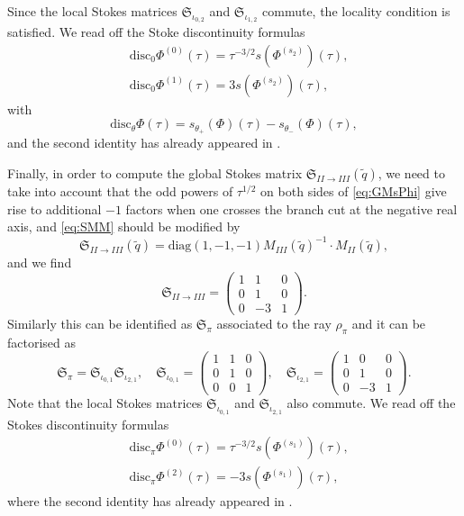 \documentclass[12pt,reqno]{amsart}
\theoremstyle{definition}
\def\tq{\tilde{q}}
\def\diag{\mathrm{diag}}
\def\mf{\mathfrak}
\begin{document}
Since the local Stokes matrices $\mf{S}_{\iota_{0,2}}$ and
$\mf{S}_{\iota_{1,2}}$ commute, the locality condition is satisfied.
We read off the Stoke discontinuity formulas
%
\begin{equation}
\label{disc-pra}
\begin{aligned}
  &\text{disc}_0 \Phi^{(0)}(\tau) = \tau^{-3/2}s(\Phi^{(s_2)})(\tau),\\
  &\text{disc}_0 \Phi^{(1)}(\tau) = 3s(\Phi^{(s_2)})(\tau),
\end{aligned}
\end{equation}
with 
\begin{equation}
  \text{disc}_\theta\Phi(\tau) = s_{\theta_+}(\Phi)(\tau) - s_{\theta_-}(\Phi)(\tau),
\end{equation}
and the second identity has already appeared in
\cite{gh-res,GGM:resurgent}.

Finally, in order to compute the global Stokes matrix
$\mf{S}_{II\rightarrow III}(\tq)$, we need to take into account that
the odd powers of $\tau^{1/2}$ on both sides of \eqref{eq:GMsPhi} give
rise to additional $-1$ factors when one crosses the branch cut at the
negative real axis, and \eqref{eq:SMM} should be modified by
\begin{equation}
  \mf{S}_{II\rightarrow III}(\tq) = \diag(1,-1,-1)
  M_{III}(\tq)^{-1}\cdot M_{II}(\tq),
\end{equation}
and we find
\begin{equation}
  \mf{S}_{II\rightarrow III} = 
  \begin{pmatrix}
    1&1&0\\
    0&1&0\\
    0&-3&1
  \end{pmatrix}.
\end{equation}
Similarly this can be identified as $\mf{S}_{\pi}$ associated to the
ray $\rho_{\pi}$ and it can be factorised as
\begin{equation}
  \mf{S}_{\pi} = \mf{S}_{\iota_{0,1}}\mf{S}_{\iota_{2,1}},\quad
  \mf{S}_{\iota_{0,1}} =
  \begin{pmatrix}
    1&1&0\\
    0&1&0\\
    0&0&1
  \end{pmatrix},\quad
  \mf{S}_{\iota_{2,1}} =
  \begin{pmatrix}
    1&0&0\\
    0&1&0\\
    0&-3&1
  \end{pmatrix}.
\end{equation}
Note that the local Stokes matrices $\mf{S}_{\iota_{0,1}}$ and
$\mf{S}_{\iota_{2,1}}$ also commute.  We read off the Stokes
discontinuity formulas
\begin{equation}
  \label{disc-prb}
\begin{aligned}
  &\text{disc}_\pi \Phi^{(0)}(\tau) =
  \tau^{-3/2}s(\Phi^{(s_1)})(\tau),\\
  &\text{disc}_\pi \Phi^{(2)}(\tau) = -3s(\Phi^{(s_1)})(\tau),
\end{aligned}
\end{equation}
where the second identity has already appeared in
\cite{GGM:resurgent}.
\end{document}
